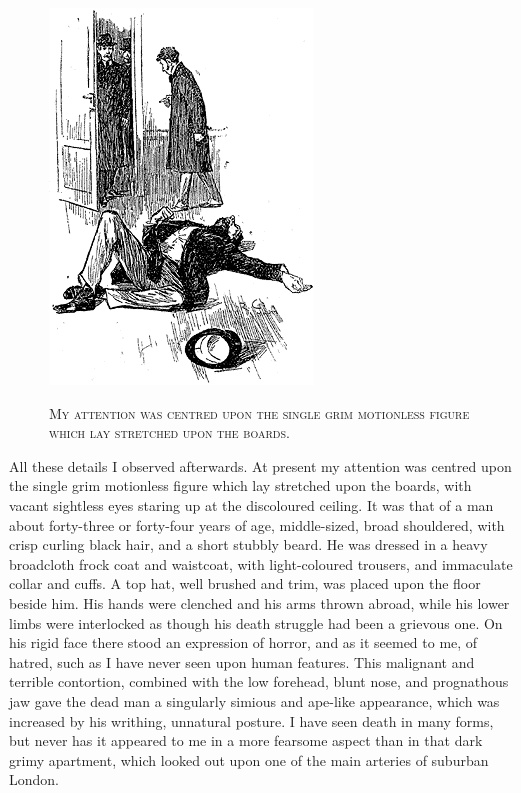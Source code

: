 \documentclass[12pt,english]{book}
\newcommand{\noun}[1]{\textsc{#1}}
\begin{document}
%
\begin{figure}[htbp]
\noindent \begin{center}\includegraphics{images/study10-stud-05.png}\end{center}

\noindent \begin{center}\noun{My attention was centred upon the
single grim motionless figure which lay stretched upon the boards.}\end{center}
\end{figure}
All these details I observed afterwards. At present my attention was
centred upon the single grim motionless figure which lay stretched
upon the boards, with vacant sightless eyes staring up at the discoloured
ceiling. It was that of a man about forty-three or forty-four years
of age, middle-sized, broad shouldered, with crisp curling black hair,
and a short stubbly beard. He was dressed in a heavy broadcloth frock
coat and waistcoat, with light-coloured trousers, and immaculate collar
and cuffs. A top hat, well brushed and trim, was placed upon the floor
beside him. His hands were clenched and his arms thrown abroad, while
his lower limbs were interlocked as though his death struggle had
been a grievous one. On his rigid face there stood an expression of
horror, and as it seemed to me, of hatred, such as I have never seen
upon human features. This malignant and terrible contortion, combined
with the low forehead, blunt nose, and prognathous jaw gave the dead
man a singularly simious and ape-like appearance, which was increased
by his writhing, unnatural posture. I have seen death in many forms,
but never has it appeared to me in a more fearsome aspect than in
that dark grimy apartment, which looked out upon one of the main arteries
of suburban London.
\end{document}
